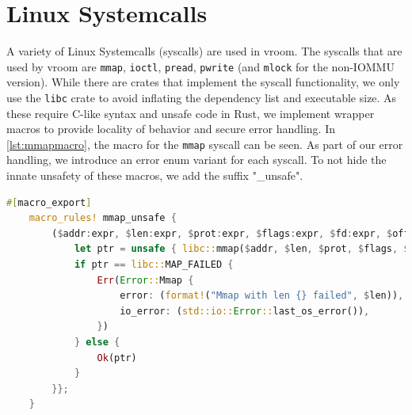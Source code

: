 \section{Linux Systemcalls}
A variety of Linux Systemcalls (syscalls) are used in vroom. The syscalls that are used by vroom are \texttt{mmap}, \texttt{ioctl}, \texttt{pread}, \texttt{pwrite} (and \texttt{mlock} for the non-IOMMU version). While there are crates that implement the syscall functionality, we only use the \texttt{libc} crate to avoid inflating the dependency list and executable size. As these require C-like syntax and unsafe code in Rust, we implement wrapper macros to provide locality of behavior and secure error handling. In \autoref{lst:mmapmacro}, the macro for the \texttt{mmap} syscall can be seen.
As part of our error handling, we introduce an error enum variant for each syscall. To not hide the innate unsafety of these macros, we add the suffix "\_unsafe".

\begin{lstlisting}[language=Rust,caption={Syscall \texttt{mmap} macro, with own error variant}, label=lst:mmapmacro]
    #[macro_export]
    macro_rules! mmap_unsafe {
        ($addr:expr, $len:expr, $prot:expr, $flags:expr, $fd:expr, $offset:expr) => {{
            let ptr = unsafe { libc::mmap($addr, $len, $prot, $flags, $fd, $offset) };
            if ptr == libc::MAP_FAILED {
                Err(Error::Mmap {
                    error: (format!("Mmap with len {} failed", $len)),
                    io_error: (std::io::Error::last_os_error()),
                })
            } else {
                Ok(ptr)
            }
        }};
    } 
\end{lstlisting}
